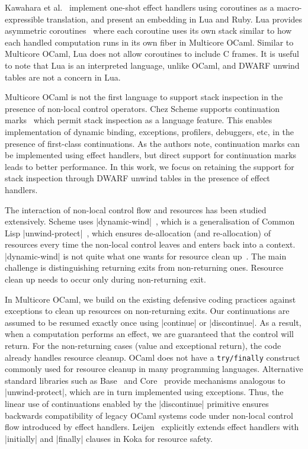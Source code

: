 \documentclass[sigplan,10pt,review,anonymous]{acmart}\settopmatter{printfolios=true,printccs=false,printacmref=false}
\begin{document}
Kawahara et al.~\cite{Kawahara20} implement one-shot effect handlers using
coroutines as a macro-expressible translation, and present an embedding in Lua
and Ruby. Lua provides asymmetric coroutines~\cite{Lua} where each coroutine
uses its own stack similar to how each handled computation runs in its own
fiber in Multicore OCaml. Similar to Multicore OCaml, Lua does not allow
coroutines to include C frames. It is useful to note that Lua is an interpreted
language, unlike OCaml, and DWARF unwind tables are not a concern in Lua.

Multicore OCaml is not the first language to support stack inspection in the
presence of non-local control operators. Chez Scheme supports continuation
marks~\cite{Flatt20} which permit stack inspection as a language feature. This
enables implementation of dynamic binding, exceptions, profilers, debuggers,
etc, in the presence of first-class continuations. As the authors note,
continuation marks can be implemented using effect handlers, but direct support
for continuation marks leads to better performance. In this work, we focus on
retaining the support for stack inspection through DWARF unwind tables in the
presence of effect handlers.

The interaction of non-local control flow and resources has been studied
extensively. Scheme uses |dynamic-wind|~\cite{R5RS}, which is a generalisation of
Common Lisp |unwind-protect|~\cite{Steele90}, which ensures de-allocation (and
re-allocation) of resources every time the non-local control leaves and enters
back into a context. |dynamic-wind| is not quite what one wants for resource
clean up~\cite{Kiselyov,Sitaram03}. The main challenge is distinguishing
returning exits from non-returning ones. Resource clean up needs to occur only
during non-returning exit.

In Multicore OCaml, we build on the existing defensive coding practices against
exceptions to clean up resources on non-returning exits. Our continuations are
assumed to be resumed exactly once using |continue| or |discontinue|. As a
result, when a computation performs an effect, we are guaranteed that the
control will return. For the non-returning cases (value and exceptional
return), the code already handles resource cleanup. OCaml does not have a
\texttt{\footnotesize try/finally} construct commonly used for resource cleanup
in many programming languages. Alternative standard libraries such as
Base~\cite{BaseProtect} and Core~\cite{CoreProtect} provide mechanisms
analogous to |unwind-protect|, which are in turn implemented using exceptions.
Thus, the linear use of continuations enabled by the |discontinue| primitive
ensures backwards compatibility of legacy OCaml systems code under non-local
control flow introduced by effect handlers. Leijen~\cite{Leijen18} explicitly
extends effect handlers with |initially| and |finally| clauses in Koka for
resource safety.
\end{document}
